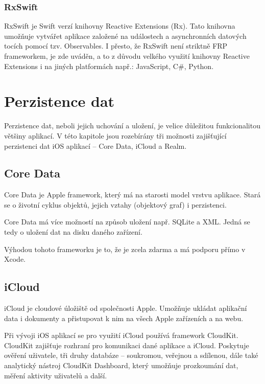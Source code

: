 \documentclass[thesis=M,czech]{FITthesis}[2012/06/26]
\begin{document}
\subsubsection{RxSwift}
RxSwift je Swift verzí knihovny Reactive Extensions (Rx). \cite{RxSwift} Tato knihovna umožňuje vytvářet aplikace založené na událostech a asynchronních datových tocích pomocí tzv. Observables. \cite{RxNET} I přesto, že RxSwift není striktně FRP frameworkem, \cite{ReactiveExtensionsDocs} je zde uváděn, a to z důvodu velkého využití knihovny Reactive Extensions i na jiných platformách např.: JavaScript, C\#, Python. \cite{ReactiveExtensions}

\section{Perzistence dat}
Perzistence dat, neboli jejich uchování a uložení, je velice důležitou funkcionalitou většiny aplikací. V této kapitole jsou rozebírány tři možnosti zajišťující perzistenci dat iOS aplikací -- Core Data, iCloud a Realm.

\subsection{Core Data}
Core Data je Apple framework, který má na starosti model vrstvu aplikace. Stará se o životní cyklus objektů, jejich vztahy (objektový graf) i perzistenci. \cite{coredata}

Core Data má více možností na způsob uložení např. SQLite a XML. Jedná se tedy o uložení dat na disku daného zařízení.  \cite{CoreDataPersistentTypes}

Výhodou tohoto frameworku je to, že je zcela zdarma a má podporu přímo v Xcode. \cite{CoreDataXcode}

\subsection{iCloud}
iCloud je cloudové úložiště od společnosti Apple. Umožňuje ukládat aplikační data i dokumenty a přistupovat k nim na všech Apple zařízeních a na webu. \cite{iCloud}

Při vývoji iOS aplikací se pro využití iCloud používá framework CloudKit. CloudKit zajišťuje rozhraní pro komunikaci dané aplikace a iCloud. \cite{CloudKitDoc} Poskytuje ověření uživatele, tři druhy databáze -- soukromou, veřejnou a sdílenou, dále také analytický nástroj CloudKit Dashboard, který umožňuje prozkoumání dat, měření aktivity uživatelů a další. \cite{CloudKit}
\end{document}
